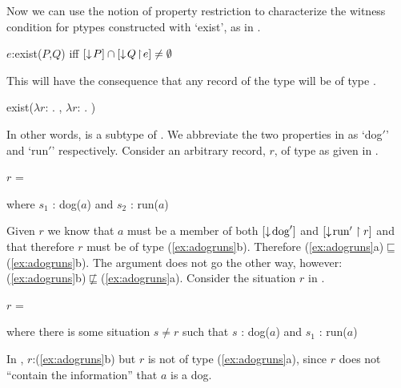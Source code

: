 Now we can use the notion of property restriction to characterize the
witness condition for ptypes constructed with `exist', as in
\nexteg{}.
\begin{ex} 
$e$:exist($P$,$Q$) iff $[\downarrow\!P]\cap[\downarrow\!Q\!\restriction\! e]\not=\emptyset$ 
\label{ex:existwitcond}
\end{ex} 
This will have the consequence that any record of the type 
will be of type .
\begin{ex} 
\begin{subex} 
 
\item {}
 
\item exist($\lambda r$:
    . ,
            $\lambda r$: . )
 
\end{subex} 
\label{ex:adogruns}
   
\end{ex} 
In other words,  is a subtype of .  We abbreviate
the two properties in  as `dog$'$' and `run$'$'
respectively.  Consider an
arbitrary record, $r$, of type  as given in \nexteg{}.
\begin{ex} 
$r$ = 

\medskip

where $s_1$ : dog($a$) and $s_2$ : run($a$)
\end{ex} 
Given $r$ we know that $a$ must be a member of both
$[\downarrow\!\text{dog}']$ and $[\downarrow\!\text{run}'\restriction r]$ and that
therefore $r$ must be of type (\ref{ex:adogruns}b).  Therefore
(\ref{ex:adogruns}a)$\sqsubseteq$(\ref{ex:adogruns}b).  The argument does
not go the other way,
however: (\ref{ex:adogruns}b)$\not\sqsubseteq$(\ref{ex:adogruns}a).  Consider
the situation $r$ in \nexteg{}.
\begin{ex} 
$r$ = 

\medskip

where there is some situation $s\not=r$ such that $s$ : dog($a$) and $s_1$ : run($a$) 
\end{ex} 
In \preveg{}, $r$:(\ref{ex:adogruns}b) but $r$ is not of type
(\ref{ex:adogruns}a), since $r$ does not ``contain the information'' that
$a$ is a dog.  

